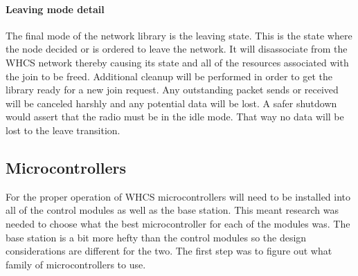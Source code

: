 \paragraph{Leaving mode detail}
The final mode of the network library is the leaving state. This is the state
where the node decided or is ordered to leave the network. It will disassociate
from the WHCS network thereby causing its state and all of the resources
associated with the join to be freed. Additional cleanup will be performed in
order to get the library ready for a new join request. Any outstanding packet
sends or received will be canceled harshly and any potential data will be lost.
A safer shutdown would assert that the radio must be in the idle mode. That way
no data will be lost to the leave transition.


\subsection{Microcontrollers}
For the proper operation of WHCS microcontrollers will need to be installed
into all of the control modules as well as the base station. This meant
research was needed to choose what the best microcontroller for each of the
modules was.  The base station is a bit more hefty than the control modules so
the design considerations are different for the two.  The first step was to
figure out what family of microcontrollers to use.

